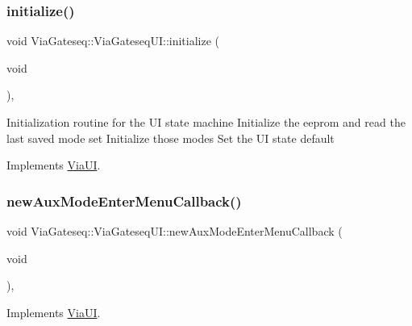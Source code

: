 \mbox{\label{class_via_gateseq_1_1_via_gateseq_u_i_ae59b0d739f92892cf9a0d16cd3d25bfa}} 
\subsubsection{\texorpdfstring{initialize()}{initialize()}}
{\footnotesize\ttfamily void Via\+Gateseq\+::\+Via\+Gateseq\+U\+I\+::initialize (\begin{DoxyParamCaption}\item[{void}]{ }\end{DoxyParamCaption})\hspace{0.3cm}{\ttfamily [override]}, {\ttfamily [virtual]}}

Initialization routine for the UI state machine Initialize the eeprom and read the last saved mode set Initialize those modes Set the UI state default 

Implements \mbox{\hyperlink{class_via_u_i_a573ba7aef8f4982ec4900258c770bdbb}{Via\+UI}}.

\mbox{\label{class_via_gateseq_1_1_via_gateseq_u_i_ad6fb8d3cdf019a290c82a9d42f3f83a7}} 
\subsubsection{\texorpdfstring{new\+Aux\+Mode\+Enter\+Menu\+Callback()}{newAuxModeEnterMenuCallback()}}
{\footnotesize\ttfamily void Via\+Gateseq\+::\+Via\+Gateseq\+U\+I\+::new\+Aux\+Mode\+Enter\+Menu\+Callback (\begin{DoxyParamCaption}\item[{void}]{ }\end{DoxyParamCaption})\hspace{0.3cm}{\ttfamily [override]}, {\ttfamily [virtual]}}



Implements \mbox{\hyperlink{class_via_u_i_a6fdbe125cd3652807631631edc636d39}{Via\+UI}}.

